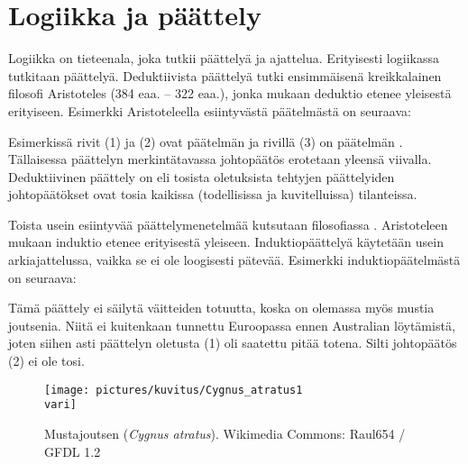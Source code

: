 \chapter{Logiikka ja päättely}

Logiikka on tieteenala, joka tutkii päättelyä ja ajattelua. Erityisesti logiikassa tutkitaan  päättelyä. Deduktiivista päättelyä tutki ensimmäisenä kreikkalainen filosofi Aristoteles (384 eaa. -- 322 eaa.), jonka mukaan deduktio etenee yleisestä erityiseen. Esimerkki Aristoteleella esiintyvästä päätelmästä on seuraava:

\bigskip
\begin{center}
\end{center}
\bigskip

Esimerkissä rivit (1) ja (2) ovat päätelmän  ja rivillä (3) on päätelmän . Tällaisessa päättelyn merkintätavassa johtopäätös erotetaan yleensä viivalla. Deduktiivinen päättely on  eli tosista oletuksista tehtyjen päättelyiden johtopäätökset ovat tosia kaikissa (todellisissa ja kuvitelluissa) tilanteissa.

Toista usein esiintyvää päättelymenetelmää kutsutaan filosofiassa . Aristoteleen mukaan induktio etenee erityisestä yleiseen. Induktiopäättelyä käytetään usein arkiajattelussa, vaikka se ei ole loogisesti pätevää. Esimerkki induktiopäätelmästä on seuraava:

\bigskip
\begin{center}
\end{center}
\bigskip

Tämä päättely ei säilytä väitteiden totuutta, koska on olemassa myös mustia joutsenia. Niitä ei kuitenkaan tunnettu Euroopassa ennen Australian löytämistä, joten siihen asti päättelyn oletusta (1) oli saatettu pitää totena. Silti johtopäätös (2) ei ole tosi.

\begin{figure}[h!]
    \centering
    \texttt{[image: pictures/kuvitus/Cygnus\_atratus1\\vari]}
    \caption{Mustajoutsen (\emph{Cygnus atratus}). Wikimedia Commons: Raul654 / GFDL 1.2}
\end{figure}

